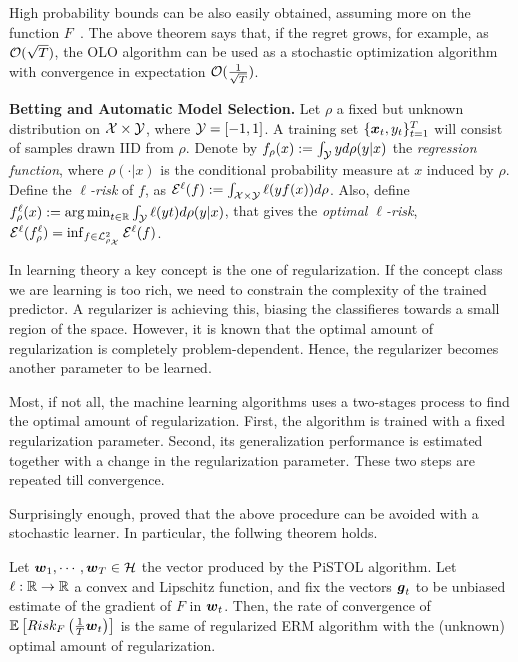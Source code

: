 High probability bounds can be also easily obtained, assuming more on the function $F$~\cite{}.
The above theorem says that, if the regret grows, for example, as $\mathcal{O}(\sqrt{T})$, the OLO algorithm can be used as a stochastic optimization algorithm with convergence in expectation $\mathcal{O}(\frac{1}{\sqrt{T}})$.

\textbf{Betting and Automatic Model Selection.}
Let $\rho$ a fixed but unknown distribution on $\mathcal{X} \times \mathcal{Y}$, where $\mathcal{Y}=[-1,1]$.
A training set $\{\boldsymbol{x}_t,y_t\}_{t=1}^T$ will consist of samples drawn \ac{IID} from $\rho$.
Denote by $f_\rho(x):= \int_{\mathcal{Y}} y d\rho(y|x)$ the \emph{regression function}, where $\rho(\cdot|x)$ is the conditional probability measure at $x$ induced by $\rho$. 
Define the \emph{$\ell$-risk} of $f$, as $\mathcal{E}^{\ell}(f):=\int_{\mathcal{X} \times \mathcal{Y}} \ell(y f(x)) d \rho$. Also, define $f^{\ell}_\rho(x):=\operatorname*{arg\,min}_{t \in \mathbb{R}} \int_{\mathcal{Y}} \ell(y t) d \rho(y|x)$, that gives the \emph{optimal $\ell$-risk}, $\mathcal{E}^{\ell}(f^{\ell}_\rho)=\inf_{f \in \mathcal{L}^2_{\rho_{\mathcal{X}}}} \mathcal{E}^{\ell}(f)$.

In learning theory a key concept is the one of regularization. If the concept class we are learning is too rich, we need to constrain the complexity of the trained predictor. A regularizer is achieving this, biasing the classifieres towards a small region of the space. However, it is known that the optimal amount of regularization is completely problem-dependent. Hence, the regularizer becomes another parameter to be learned.

Most, if not all, the machine learning algorithms uses a two-stages process to find the optimal amount of regularization. First, the algorithm is trained with a fixed regularization parameter. Second, its generalization performance is estimated together with a change in the regularization parameter. These two steps are repeated till convergence.

Surprisingly enough, \citep{} proved that the above procedure can be avoided with a stochastic learner. In particular, the follwing theorem holds.
\begin{theorem}
Let $\boldsymbol{w}_1, \cdots, \boldsymbol{w}_T \in \mathcal{H}$ the vector produced by the PiSTOL algorithm.
Let $\ell:\mathbb{R}\rightarrow\mathbb{R}$ a convex and Lipschitz function, and fix the vectors $\boldsymbol{g}_t$ to be unbiased estimate of the gradient of $F$ in $\boldsymbol{w}_t$. Then, the rate of convergence of $\mathbb{E}\left[Risk_F\left(\frac{1}{T} \boldsymbol{w}_t\right)\right]$ is the same of regularized ERM algorithm with the (unknown) optimal amount of regularization.
\end{theorem}

